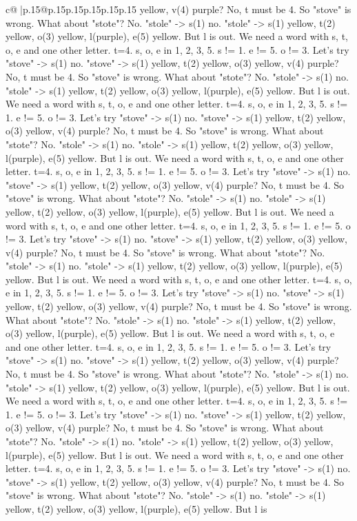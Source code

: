 \documentclass{article}
\begin{document}
{\begin{supertabular}{c@{$\;$}|p{.15\linewidth}@{}p{.15\linewidth}p{.15\linewidth}p{.15\linewidth}p{.15\linewidth}p{.15\linewidth}}
{{{yellow, v(4) purple? No, t must be 4. So "stove" is wrong. What about "stote"? No. "stole" {-}> s(1) no. "stole" {-}> s(1) yellow, t(2) yellow, o(3) yellow, l(purple), e(5) yellow. But l is out. We need a word with s, t, o, e and one other letter. t=4. s, o, e in 1, 2, 3, 5. s != 1. e != 5. o != 3. Let's try "stove" {-}> s(1) no. "stove" {-}> s(1) yellow, t(2) yellow, o(3) yellow, v(4) purple? No, t must be 4. So "stove" is wrong. What about "stote"? No. "stole" {-}> s(1) no. "stole" {-}> s(1) yellow, t(2) yellow, o(3) yellow, l(purple), e(5) yellow. But l is out. We need a word with s, t, o, e and one other letter. t=4. s, o, e in 1, 2, 3, 5. s != 1. e != 5. o != 3. Let's try "stove" {-}> s(1) no. "stove" {-}> s(1) yellow, t(2) yellow, o(3) yellow, v(4) purple? No, t must be 4. So "stove" is wrong. What about "stote"? No. "stole" {-}> s(1) no. "stole" {-}> s(1) yellow, t(2) yellow, o(3) yellow, l(purple), e(5) yellow. But l is out. We need a word with s, t, o, e and one other letter. t=4. s, o, e in 1, 2, 3, 5. s != 1. e != 5. o != 3. Let's try "stove" {-}> s(1) no. "stove" {-}> s(1) yellow, t(2) yellow, o(3) yellow, v(4) purple? No, t must be 4. So "stove" is wrong. What about "stote"? No. "stole" {-}> s(1) no. "stole" {-}> s(1) yellow, t(2) yellow, o(3) yellow, l(purple), e(5) yellow. But l is out. We need a word with s, t, o, e and one other letter. t=4. s, o, e in 1, 2, 3, 5. s != 1. e != 5. o != 3. Let's try "stove" {-}> s(1) no. "stove" {-}> s(1) yellow, t(2) yellow, o(3) yellow, v(4) purple? No, t must be 4. So "stove" is wrong. What about "stote"? No. "stole" {-}> s(1) no. "stole" {-}> s(1) yellow, t(2) yellow, o(3) yellow, l(purple), e(5) yellow. But l is out. We need a word with s, t, o, e and one other letter. t=4. s, o, e in 1, 2, 3, 5. s != 1. e != 5. o != 3. Let's try "stove" {-}> s(1) no. "stove" {-}> s(1) yellow, t(2) yellow, o(3) yellow, v(4) purple? No, t must be 4. So "stove" is wrong. What about "stote"? No. "stole" {-}> s(1) no. "stole" {-}> s(1) yellow, t(2) yellow, o(3) yellow, l(purple), e(5) yellow. But l is out. We need a word with s, t, o, e and one other letter. t=4. s, o, e in 1, 2, 3, 5. s != 1. e != 5. o != 3. Let's try "stove" {-}> s(1) no. "stove" {-}> s(1) yellow, t(2) yellow, o(3) yellow, v(4) purple? No, t must be 4. So "stove" is wrong. What about "stote"? No. "stole" {-}> s(1) no. "stole" {-}> s(1) yellow, t(2) yellow, o(3) yellow, l(purple), e(5) yellow. But l is out. We need a word with s, t, o, e and one other letter. t=4. s, o, e in 1, 2, 3, 5. s != 1. e != 5. o != 3. Let's try "stove" {-}> s(1) no. "stove" {-}> s(1) yellow, t(2) yellow, o(3) yellow, v(4) purple? No, t must be 4. So "stove" is wrong. What about "stote"? No. "stole" {-}> s(1) no. "stole" {-}> s(1) yellow, t(2) yellow, o(3) yellow, l(purple), e(5) yellow. But l is out. We need a word with s, t, o, e and one other letter. t=4. s, o, e in 1, 2, 3, 5. s != 1. e != 5. o != 3. Let's try "stove" {-}> s(1) no. "stove" {-}> s(1) yellow, t(2) yellow, o(3) yellow, v(4) purple? No, t must be 4. So "stove" is wrong. What about "stote"? No. "stole" {-}> s(1) no. "stole" {-}> s(1) yellow, t(2) yellow, o(3) yellow, l(purple), e(5) yellow. But l is }}}
\end{supertabular}}
\end{document}
